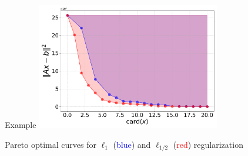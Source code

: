 \documentclass[aspectratio=169,11pt]{beamer}
\begin{document}
\begin{frame}{Example}
\centering
\includegraphics[width=0.60\textwidth]{pareto_curve_version2.pdf}
\vfill\centering

Pareto optimal curves for $\ell_1$ (\textcolor{blue}{blue}) and $\ell_{1/2}$ (\textcolor{red}{red}) regularization
\end{frame}

%

\end{document}
